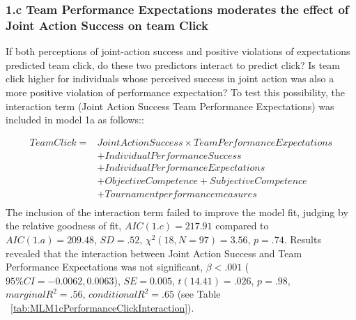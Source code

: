 \documentclass[12pt]{report}
\begin{document}
{\subsubsection{1.c Team Performance Expectations moderates the effect of Joint Action Success on team Click}

If both perceptions of joint-action success and positive violations of expectations predicted team click, do these two predictors interact to predict click? Is team click higher for individuals whose perceived success in joint action was also a more positive violation of performance expectation? To test this possibility, the interaction term (Joint Action Success \times Team Performance Expectations) was included in model 1a as follows::

\begin{equation}
  \begin{align*}
    Team Click =  & Joint Action Success \times Team Performance Expectations \\
              &+ Individual Performance Success \\
              &+ Individual Performance Expectations \\
              &+ Objective Competence + Subjective Competence  \\
              &+ Tournament performance measures \\
  \end{align*}
\end{equation}
\bigskip
The inclusion of the interaction term failed to improve the model fit, judging by the relative goodness of fit, $AIC(1.c) = 217.91$ compared to $AIC(1.a) = 209.48$, $SD = .52 $, $\chi^2(18, N = 97) = 3.56$, $ p =.74$.  Results revealed that the interaction between Joint Action Success and Team Performance Expectations was not significant, $\beta < .001$ ($95\% CI =  -0.0062, 0.0063$), $SE = 0.005$, $t(14.41) = .026$, $p = .98$, $marginal R^2 = .56$, $conditional R^2 = .65$ (see Table ~\ref{tab:MLM1cPerformanceClickInteraction}).






}
\end{document}
